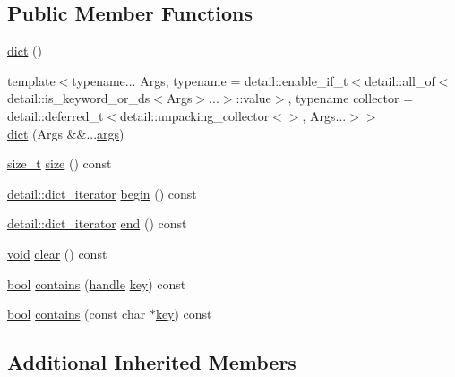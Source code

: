 \subsection*{Public Member Functions}
\begin{DoxyCompactItemize}
\item 
\mbox{\hyperlink{classdict_af92208fa49f7ff889e84345935c57cc3}{dict}} ()
\item 
{\footnotesize template$<$typename... Args, typename  = detail\+::enable\+\_\+if\+\_\+t$<$detail\+::all\+\_\+of$<$detail\+::is\+\_\+keyword\+\_\+or\+\_\+ds$<$\+Args$>$...$>$\+::value$>$, typename collector  = detail\+::deferred\+\_\+t$<$detail\+::unpacking\+\_\+collector$<$$>$, Args...$>$$>$ }\\\mbox{\hyperlink{classdict_aa3fad12466e620bf39db98715843786a}{dict}} (Args \&\&...\mbox{\hyperlink{classargs}{args}})
\item 
\mbox{\hyperlink{detail_2common_8h_a801d6a451a01953ef8cbae6feb6a3638}{size\+\_\+t}} \mbox{\hyperlink{classdict_a9be291f1c7d50a4ea786626593b8bee3}{size}} () const
\item 
\mbox{\hyperlink{pytypes_8h_a3c02b3eee4eaa3b690bcdb0405242079}{detail\+::dict\+\_\+iterator}} \mbox{\hyperlink{classdict_afed9b5478ca2a25cd3f6f156a416613c}{begin}} () const
\item 
\mbox{\hyperlink{pytypes_8h_a3c02b3eee4eaa3b690bcdb0405242079}{detail\+::dict\+\_\+iterator}} \mbox{\hyperlink{classdict_ade49fb36897f05ec11bf639bc76a2383}{end}} () const
\item 
\mbox{\hyperlink{_s_d_l__opengles2__gl2ext_8h_ae5d8fa23ad07c48bb609509eae494c95}{void}} \mbox{\hyperlink{classdict_a6bc691cda775c31d30b0184680e7ac81}{clear}} () const
\item 
\mbox{\hyperlink{asdl_8h_af6a258d8f3ee5206d682d799316314b1}{bool}} \mbox{\hyperlink{classdict_a3c671a72a013938f78c84322ec8eaa1b}{contains}} (\mbox{\hyperlink{classhandle}{handle}} \mbox{\hyperlink{setobject_8h_ab06f52e01abcbec81a27c56570d3c10b}{key}}) const
\item 
\mbox{\hyperlink{asdl_8h_af6a258d8f3ee5206d682d799316314b1}{bool}} \mbox{\hyperlink{classdict_ad7038a44b5497ce3cc11990c058b5ce6}{contains}} (const char $\ast$\mbox{\hyperlink{setobject_8h_ab06f52e01abcbec81a27c56570d3c10b}{key}}) const
\end{DoxyCompactItemize}
\subsection*{Additional Inherited Members}


